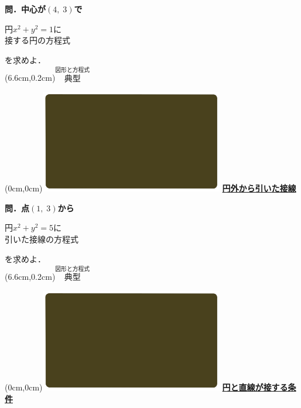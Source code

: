 \documentclass[10pt,
fleqn,
dvipdfmx,
uplatex
]{jsarticle}
\begin{document}
\large
\bf\boldmath 問．中心が$\left(4,\;3\right)$で

\huge 
\hspace{0.1zw}
円$x^2+y^2=1$に\vspace{-0.1zw}\\
\hfill 接する円の方程式

\large
\hfill を求めよ．\\
\at(6.6cm,0.2cm){\small\color{bradorange}$\overset{\text{図形と方程式}}{\text{典型}}$}

\newpage

\at(0cm,0cm){\includegraphics[width=8cm,bb=0 0 1920 1080]{./youtube/thumbnails/templates/smart_background/図形と方程式.jpeg}}
{\color{orange}\bf\boldmath\LARGE\underline{円外から引いた接線}}\vspace{0.3zw}

\large
\bf\boldmath 問．点$\left(1,\;3\right)$から

\huge 
\hspace{0.1zw}
円$x^2+y^2=5$に\vspace{-0.1zw}\\
\hfill 引いた接線の方程式\vspace{0.2zw}

\large
\hfill を求めよ．\\

\at(6.6cm,0.2cm){\small\color{bradorange}$\overset{\text{図形と方程式}}{\text{典型}}$}

\newpage

\at(0cm,0cm){\includegraphics[width=8cm,bb=0 0 1920 1080]{./youtube/thumbnails/templates/smart_background/図形と方程式.jpeg}}
{\color{orange}\bf\boldmath\LARGE\underline{円と直線が接する条件}}\vspace{0.3zw}
\end{document}
